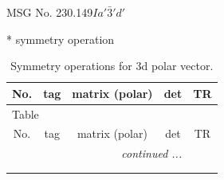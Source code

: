 \documentclass[fleqn,8pt]{jsarticle}
\begin{document}
\setcounter{MaxMatrixCols}{32}

\renewcommand{\tablename}{Table~}
\renewcommand{\figurename}{Figure~}
\begin{center}
\LARGE
MSG No. 230.149\quad$Ia'\bar{3}'d'$
\end{center}
* symmetry operation
\renewcommand{\arraystretch}{1.3}
\begin{longtable}{ccccc}
\caption{Symmetry operations for 3d polar vector.}
 \\
 \hline \hline
No. & tag & matrix (polar) & det & TR \\ \hline \endfirsthead

\multicolumn{4}{l}{\tablename\ \thetable{}} \\
 \hline \hline
No. & tag & matrix (polar) & det & TR \\ \hline \endhead

 \hline \hline
\multicolumn{4}{r}{\footnotesize\it continued ...} \\ \endfoot

 \hline \hline
\multicolumn{4}{r}{} \\ \endlastfoot


\end{longtable}
\end{document}
